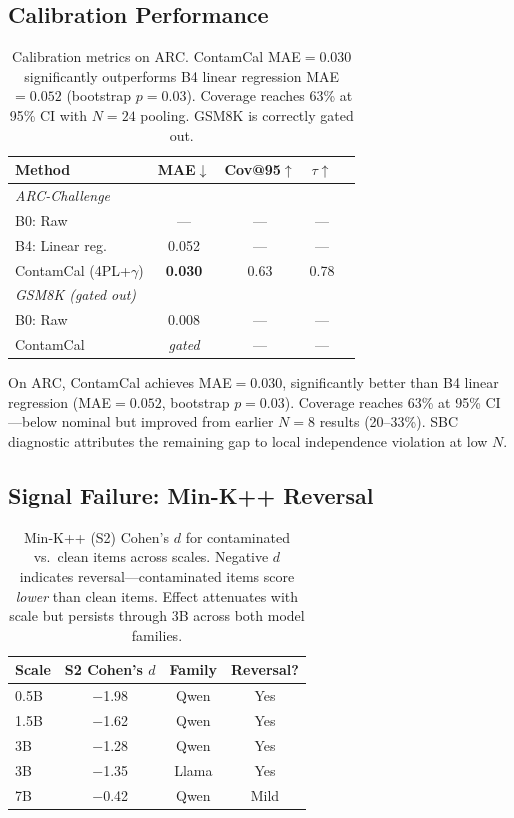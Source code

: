 \documentclass[11pt,a4paper]{article}
\newcommand{\gam}{\gamma}
\begin{document}
\subsection{Calibration Performance}

\begin{table}[t]
\centering
\small
\begin{tabular}{lcccc}
\toprule
\textbf{Method} & \textbf{MAE}$\downarrow$ & \textbf{Cov@95}$\uparrow$ & \textbf{$\tau$}$\uparrow$ \\
\midrule
\multicolumn{4}{l}{\textit{ARC-Challenge}} \\
B0: Raw & --- & --- & --- \\
B4: Linear reg. & 0.052 & --- & --- \\
ContamCal (4PL+$\gam$) & \textbf{0.030} & 0.63 & 0.78 \\
\midrule
\multicolumn{4}{l}{\textit{GSM8K (gated out)}} \\
B0: Raw & 0.008 & --- & --- \\
ContamCal & \textit{gated} & --- & --- \\
\bottomrule
\end{tabular}
\caption{Calibration metrics on ARC. ContamCal MAE${=}0.030$ significantly outperforms B4 linear regression MAE${=}0.052$ (bootstrap $p{=}0.03$). Coverage reaches 63\% at 95\% CI with $N{=}24$ pooling. GSM8K is correctly gated out.}
\label{tab:calibration}
\end{table}

On ARC, ContamCal achieves MAE${=}0.030$, significantly better than B4 linear regression (MAE${=}0.052$, bootstrap $p{=}0.03$). Coverage reaches 63\% at 95\% CI---below nominal but improved from earlier $N{=}8$ results (20--33\%). SBC diagnostic attributes the remaining gap to local independence violation at low $N$.

\subsection{Signal Failure: Min-K++ Reversal}

\begin{table}[t]
\centering
\small
\begin{tabular}{lccc}
\toprule
\textbf{Scale} & \textbf{S2 Cohen's $d$} & \textbf{Family} & \textbf{Reversal?} \\
\midrule
0.5B & $-$1.98 & Qwen & Yes \\
1.5B & $-$1.62 & Qwen & Yes \\
3B & $-$1.28 & Qwen & Yes \\
3B & $-$1.35 & Llama & Yes \\
7B & $-$0.42 & Qwen & Mild \\
\bottomrule
\end{tabular}
\caption{Min-K++ (S2) Cohen's $d$ for contaminated vs.\ clean items across scales. Negative $d$ indicates reversal---contaminated items score \emph{lower} than clean items. Effect attenuates with scale but persists through 3B across both model families.}
\label{tab:reversal}
\end{table}
\end{document}
